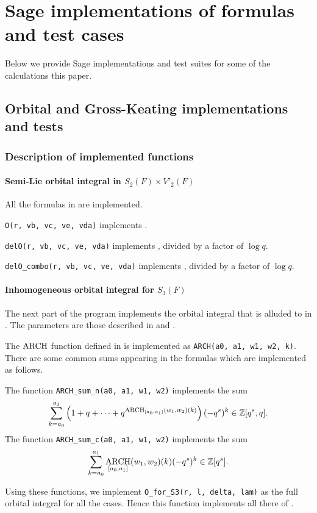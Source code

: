 \chapter{Sage implementations of formulas and test cases}
Below we provide Sage implementations and test suites
for some of the calculations this paper.

\section{Orbital and Gross-Keating implementations and tests}
\subsection{Description of implemented functions}
\subsubsection{Semi-Lie orbital integral in $S_2(F) \times V'_2(F)$}
All the formulas in  are implemented.
\begin{itemize}
  \ii \texttt{O(r, vb, vc, ve, vda)}
  implements .

  \ii \texttt{delO(r, vb, vc, ve, vda)}
  implements ,
  divided by a factor of $\log q$.

  \ii \texttt{delO\_combo(r, vb, vc, ve, vda)}
  implements ,
  divided by a factor of $\log q$.
\end{itemize}

\subsubsection{Inhomogeneous orbital integral for $S_3(F)$}
The next part of the program implements the orbital integral
that is alluded to in .
The parameters are those described in  and .
\begin{itemize}
  \ii The $\operatorname*{ARCH}$ function defined in  is implemented
  as \texttt{ARCH(a0, a1, w1, w2, k)}.
  \ii There are some common sums appearing in the formulas
  which are implemented as follows.
  \begin{itemize}
    \ii The function \texttt{ARCH\_sum\_n(a0, a1, w1, w2)} implements the sum
    \[ \sum_{k=a_0}^{a_1} \left( 1 + q + \dots
      + q^{\operatorname*{ARCH}_{[a_0, a_1]}(w_1, w_2)(k)} \right) (-q^s)^k \in \mathbb Z[q^s, q]. \]
    \ii The function \texttt{ARCH\_sum\_c(a0, a1, w1, w2)} implements the sum
    \[ \sum_{k=a_0}^{a_1} \operatorname*{ARCH}_{[a_0, a_1]}(w_1, w_2)(k) (-q^s)^k \in \mathbb Z[q^s]. \]
  \end{itemize}
  \ii Using these functions, we implement \texttt{O\_for\_S3(r, l, delta, lam)}
  as the full orbital integral for all the cases.
  Hence this function implements all there of
  .
\end{itemize}

